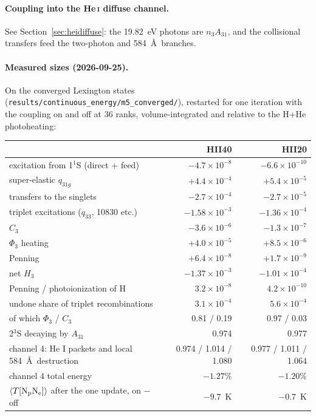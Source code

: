 \documentclass[english,a4paper]{my_memo}
\newcommand{\code}[1]{\texttt{#1}}
\begin{document}
\paragraph{Coupling into the He\,\textsc{i} diffuse channel.}  See
Section~\ref{sec:heidiffuse}: the 19.82~eV photons are $n_3A_{31}$, and the
collisional transfers feed the two-photon and 584~\AA\ branches.

\paragraph{Measured sizes (2026-09-25).}  On the converged Lexington states
(\code{results/continuous\_energy/m5\_converged/}), restarted for one
iteration with the coupling on and off at 36 ranks, volume-integrated and
relative to the H+He photoheating:
\begin{center}
\begin{tabular}{lrr}
\toprule
 & HII40 & HII20 \\
\midrule
excitation from 1$^1$S (direct + feed)      & $-4.7{\times}10^{-8}$ & $-6.6{\times}10^{-10}$ \\
super-elastic $q_{31g}$                      & $+4.4{\times}10^{-4}$ & $+5.4{\times}10^{-5}$ \\
transfers to the singlets                    & $-2.7{\times}10^{-4}$ & $-2.7{\times}10^{-5}$ \\
triplet excitations ($q_{33}$, 10830 etc.)   & $-1.58{\times}10^{-3}$ & $-1.36{\times}10^{-4}$ \\
$C_3$                                        & $-3.6{\times}10^{-6}$ & $-1.3{\times}10^{-7}$ \\
$\Phi_3$ heating                             & $+4.0{\times}10^{-5}$ & $+8.5{\times}10^{-6}$ \\
Penning                                      & $+6.4{\times}10^{-8}$ & $+1.7{\times}10^{-9}$ \\
net $H_3$                                    & $-1.37{\times}10^{-3}$ & $-1.01{\times}10^{-4}$ \\
\midrule
Penning / photoionization of H               & $3.2{\times}10^{-8}$ & $4.2{\times}10^{-10}$ \\
undone share of triplet recombinations       & $3.1{\times}10^{-4}$ & $5.6{\times}10^{-4}$ \\
\quad of which $\Phi_3$ / $C_3$              & 0.81 / 0.19 & 0.97 / 0.03 \\
2$^3$S decaying by $A_{31}$                  & 0.974 & 0.977 \\
channel 4: He I packets and local 584~\AA\ destruction
                                             & 0.974 / 1.014 / 1.080 & 0.977 / 1.011 / 1.064 \\
channel 4 total energy                       & $-1.27\%$ & $-1.20\%$ \\
$\langle T[{\rm N_pN_e}]\rangle$ after the one update, on $-$ off
                                             & $-9.7$~K & $-0.7$~K \\
\bottomrule
\end{tabular}
\end{center}
\end{document}
